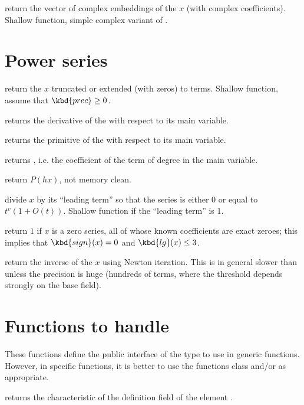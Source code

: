  return the vector of complex
embeddings of the  $x$ (with complex coefficients). Shallow
function, simple complex variant of .

\section{Power series}

 return the  $x$ truncated
or extended (with zeros) to  terms. Shallow function, assume
that $\kbd{prec} \geq 0$.

 returns the derivative of the  
with respect to its main variable.

 returns the primitive of the  
with respect to its main variable.

 returns , i.e.
the coefficient of the term of degree  in the main variable.

 return $P(h x)$, not memory clean.

 divide $x$ by its ``leading term'' so that
the series is either $0$ or equal to $t^v(1+O(t))$. Shallow function if the
``leading term'' is $1$.

 return $1$ if $x$ is a zero series, all
of whose known coefficients are exact zeroes; this implies that
$\kbd{sign}(x) = 0$ and $\kbd{lg}(x) \leq 3$.

 return the inverse of the  $x$ using
Newton iteration. This is in general slower than  unless the
precision is huge (hundreds of terms, where the threshold depends strongly
on the base field).

\section{Functions to handle }
These functions define the public interface of the  type to use in
generic functions.  However, in specific functions, it is better to use the
functions class  and/or  as appropriate.

 returns the characteristic of the definition field of the
 element .


